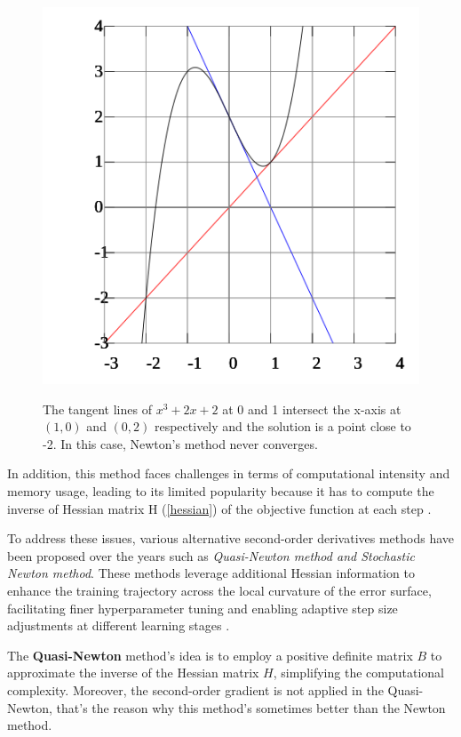 \documentclass[12pt,a4paper]{article}
\begin{document}
\begin{figure}[!htb]
	\centering
	\begin{minipage}[c]{0.7\textwidth}
		\centering
		\includegraphics[width=0.7\linewidth]{assets/newton_method_tangent_line}
		\caption{The tangent lines of $x^3  + 2x + 2$ at 0 and 1 intersect the x-axis at $(1, 0)$ and $(0, 2)$ respectively and the solution is a point close to -2. In this case, Newton's method never converges.}
		\label{fig:newtonmethodtangentline}
	\end{minipage}
\end{figure}

In addition, this method faces challenges in terms of computational intensity and memory usage, leading to its limited popularity because it has to compute the inverse of Hessian matrix H (\ref*{hessian}) of the objective function at each step \cite{optimization}. 

To address these issues, various alternative second-order derivatives methods have been proposed over the years such as \textit{Quasi-Newton method and Stochastic Newton method}. These methods leverage additional Hessian information to enhance the training trajectory across the local curvature of the error surface, facilitating finer hyperparameter tuning and enabling adaptive step size adjustments at different learning stages \cite{newton}.

The \textbf{Quasi-Newton} method's idea is to employ a positive definite matrix \(B\) to approximate the inverse of the Hessian matrix \(H\), simplifying the computational complexity. Moreover, the second-order gradient is not applied in the Quasi-Newton, that's the reason why this method's sometimes better than the Newton method.
\end{document}
